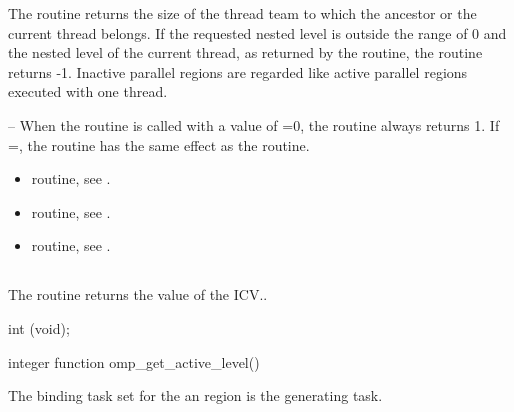 \effect
The  routine returns the size of the thread team to which the 
ancestor or the current thread belongs. If the requested nested level is outside the range 
of 0 and the nested level of the current thread, as returned by the  
routine, the routine returns -1. Inactive parallel regions are regarded like active parallel 
regions executed with one thread. 

\notestart
\noteheader – When the  routine is called with a value of =0, 
the routine always returns 1. If =, the routine has the same 
effect as the\linebreak {} routine. 
\noteend

\crossreferences
\begin{itemize}
\item {} routine, see 
.

\item {} routine, see 
.

\item {} routine, see 
.
\end{itemize}









\subsection{}
\label{subsec:omp_get_active_level}
\summary
The  routine returns the value of the  ICV..

\format
\ccppspecificstart
\begin{boxedcode}
int (void);
\end{boxedcode}
\ccppspecificend

\pagebreak
\fortranspecificstart
\begin{boxedcode}
integer function omp\_get\_active\_level()
\end{boxedcode}
\fortranspecificend

\binding
The binding task set for the an  region is the generating 
task. 

